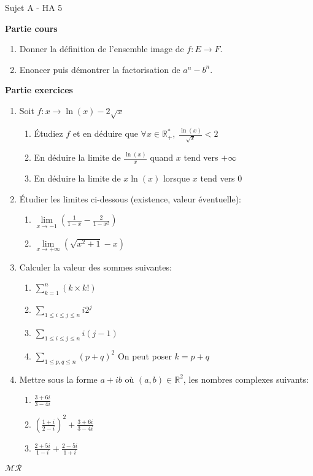 \documentclass[a4paper,11pt, landscape]{article}
\begin{document}
\begin{multicols*}{3}
\setlength{\columnsep}{1cm}
\centerline{Sujet A - HA 5}
\begin{flushleft}
  \textbf{Partie cours} 
\end{flushleft} 

\begin{enumerate}[leftmargin=*]
  \item Donner la définition de l'ensemble image de $f : E \rightarrow F$.
  \item Enoncer puis démontrer la factorisation de $a^n - b^n$.
\end{enumerate}
\textbf{Partie exercices}
\begin{enumerate}[leftmargin=*]
  \item Soit $f : x \rightarrow \ln \left(x\right) - 2\sqrt{x}$
 \begin{enumerate}
   \item Étudiez $f$ et en déduire que $\forall x \in \mathbb{R}_+^*, \; \frac{\ln (x)}{\sqrt{x}} < 2$
   \item En déduire la limite de $\frac{\ln(x)}{x}$ quand $x$ tend vers $+\infty$
   \item En déduire la limite de $x\ln(x)$ lorsque $x$ tend vers 0
 \end{enumerate}
  \item Étudier les limites ci-dessous (existence, valeur éventuelle):
  \begin{enumerate}
    \item $\lim\limits_{x \rightarrow -1}\left(\frac{1}{1-x} - \frac{2}{1-x^2}\right)$
    \item $\lim\limits_{x \rightarrow +\infty }\left(\sqrt{x^2+1} - x\right)$
  \end{enumerate}
  \item Calculer la valeur des sommes suivantes:
  \begin{enumerate}
    \item $\sum\limits_{k=1}^n(k \times  k!)$
    \item $\sum\limits_{1\leq i \leq j \leq n}i2^j$
    \item $\sum\limits_{1\leq i \leq j \leq n}i(j-1)$
    \item $\sum\limits_{1\leq p,q \leq n}(p+q)^2$ On peut poser $k = p+q$
  \end{enumerate}
  \item Mettre sous la forme $a + ib$ où $(a,b) \in \mathbb{R}^2$, les nombres complexes suivants:
  \begin{enumerate}
    \item $\frac{3+6i}{3-4i}$
    \item $\left(\frac{1+i}{2-i}\right)^2 + \frac{3+6i}{3-4i}$
    \item $\frac{2+5i}{1-i} + \frac{2-5i}{1+i}$
  \end{enumerate}
\end{enumerate}
\centerline{$\mathcal{MR}$}


\end{multicols*}
\end{document}
